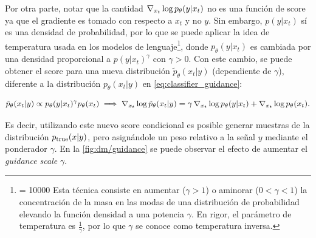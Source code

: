 Por otra parte, notar que la cantidad $\nabla_{x_t} \log p_\theta(y|x_t)$ no es una función de score ya que el gradiente es tomado con respecto a $x_t$ y no $y$. Sin embargo, $p(y|x_t)$ sí es una densidad de probabilidad, por lo que se puede aplicar la idea de temperatura usada en los modelos de lenguaje\footnote{\interlinepenalty = 10000 Esta técnica consiste en aumentar ($\gamma>1$) o aminorar ($0<\gamma<1$) la concentración de la masa en las modas de una distribución de probabilidad elevando la función densidad a una potencia $\gamma$. En rigor, el parámetro de temperatura es $\frac{1}{\gamma}$, por lo que $\gamma$ se conoce como temperatura inversa.}, donde $p_\theta(y|x_t)$ es cambiada por una densidad proporcional a $p(y|x_t)^\gamma$ con $\gamma>0$. Con este cambio, se puede obtener el score para una nueva distribución $\tilde{p}_\theta(x_t|y)$ (dependiente de $\gamma$), diferente a la distribución $p_\theta(x_t|y)$ en \eqref{eq:classifier_guidance}:

\begin{equation}
    \label{eq:guidance_temperature}
    \tilde{p}_\theta(x_t|y) \propto p_\theta(y|x_t)^\gamma p_\theta(x_t)
    \implies
    \nabla_{x_t} \log \tilde{p}_\theta(x_t|y) = \gamma\,\nabla_{x_t} \log p_\theta(y|x_t) + \nabla_{x_t} \log p_\theta(x_t).
\end{equation}

Es decir, utilizando este nuevo score condicional es posible generar muestras de la distribución $p_{\operatorname{true}}(x|y)$, pero asignándole un peso relativo a la señal $y$ mediante el ponderador $\gamma$. En la \autoref{fig:dm/guidance} se puede observar el efecto de aumentar el \textit{guidance scale} $\gamma$.

